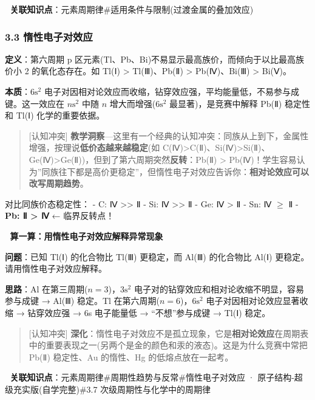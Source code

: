🔗 \textbf{关联知识点}：元素周期律\#适用条件与限制(过渡金属的叠加效应)

\subsubsection{3.3 惰性电子对效应}\label{ux60f0ux6027ux7535ux5b50ux5bf9ux6548ux5e94}

\textbf{定义}：第六周期 p 区元素(Tl、Pb、Bi)不易显示最高族价，而倾向于以比最高族价小 2 的氧化态存在。如 Tl(Ⅰ) \textgreater{} Tl(Ⅲ)、Pb(Ⅱ) \textgreater{} Pb(Ⅳ)、Bi(Ⅲ) \textgreater{} Bi(Ⅴ)。

\textbf{本质}：\(6\mathrm{s}^2\) 电子对因相对论效应而收缩，钻穿效应强，平均能量低，不易参与成键。这一效应在 \(n\mathrm{s}^2\) 中随 \(n\) 增大而增强(\(6\mathrm{s}^2\) 最显著)，是竞赛中解释 Pb(Ⅱ) 稳定性和 Tl(Ⅰ) 化学的重要依据。

\begin{quote}
{[}认知冲突{]} \textbf{教学洞察}---这里有一个经典的认知冲突：同族从上到下，金属性增强，按理说\textbf{低价态越来越稳定}(如 C(Ⅳ)\textgreater C(Ⅱ)、Si(Ⅳ)\textgreater Si(Ⅱ)、Ge(Ⅳ)\textgreater Ge(Ⅱ))，但到了第六周期突然\textbf{反转}：Pb(Ⅱ) \textgreater{} Pb(Ⅳ)！学生容易认为''同族往下都是高价更稳定''，但惰性电子对效应告诉你：\textbf{相对论效应可以改写周期趋势}。
\end{quote}

对比同族价态稳定性：
- C: Ⅳ \textgreater\textgreater{} Ⅱ
- Si: Ⅳ \textgreater\textgreater{} Ⅱ
- Ge: Ⅳ \textgreater{} Ⅱ
- Sn: Ⅳ \(\geq\) Ⅱ
- \textbf{Pb: Ⅱ \textgreater{} Ⅳ} ← 临界反转点！

📝 \textbf{算一算：用惰性电子对效应解释异常现象}

\textbf{问题}：已知 Tl(Ⅰ) 的化合物比 Tl(Ⅲ) 更稳定，而 Al(Ⅲ) 的化合物比 Al(Ⅰ) 更稳定。请用惰性电子对效应解释。

\textbf{思路}：Al 在第三周期(\(n=3\))，\(3\mathrm{s}^2\) 电子对的钻穿效应和相对论收缩不明显，容易参与成键 → Al(Ⅲ) 稳定。Tl 在第六周期(\(n=6\))，\(6\mathrm{s}^2\) 电子对因相对论效应显著收缩 → 钻穿效应强 → 6s 电子能量低 → ``不想''参与成键 → Tl(Ⅰ) 稳定。

\begin{quote}
{[}认知冲突{]} \textbf{深化}：惰性电子对效应不是孤立现象，它是\textbf{相对论效应}在周期表中的重要表现之一(另两个是金的颜色和汞的液态)。这是为什么竞赛中常把 Pb(Ⅱ) 稳定性、Au 的惰性、Hg 的低熔点放在一起考。
\end{quote}

🔗 \textbf{关联知识点}：元素周期律\#周期性趋势与反常\#惰性电子对效应 · 原子结构-超级充实版(自学完整)\#3.7 次级周期性与化学中的周期律


